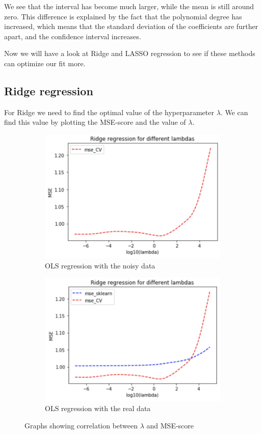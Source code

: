 \documentclass[12pt]{extarticle}
\begin{document}
We see that the interval has become much larger, while the mean is still around zero. This difference is explained by the fact that the polynomial degree has increased, which means that the standard deviation of the coefficients are further apart, and the confidence interval increases.

Now we will have a look at Ridge and LASSO regression to see if these methods can optimize our fit more.

\subsection{Ridge regression}

For Ridge we need to find the optimal value of the hyperparameter $\lambda$. We can find this value by plotting the MSE-score and the value of $\lambda$.

\begin{figure}
    \centering
    \begin{subfigure}{.5\textwidth}
        \centering
        \includegraphics[width=.9\linewidth]{5}
        \caption{OLS regression with the noisy data}
        \label{fig:f6sub1}
    \end{subfigure}%
    \begin{subfigure}{.5\textwidth}
        \centering
        \includegraphics[width=.9\linewidth]{6}
        \caption{OLS regression with the real data}
        \label{fig:f6sub2}
    \end{subfigure}
    \caption{Graphs showing correlation between $\lambda$ and MSE-score}
    \label{fig:f6}
\end{figure}
\end{document}
